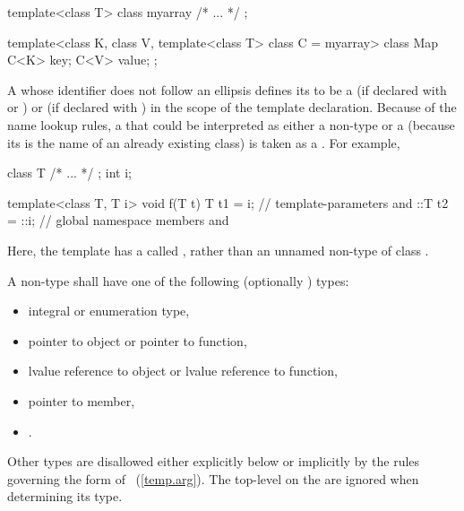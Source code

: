 \begin{codeblock}
template<class T> class myarray { /* ... */ };

template<class K, class V, template<class T> class C = myarray>
class Map {
  C<K> key;
  C<V> value;
};
\end{codeblock}
\exitnote

\pnum
A
whose identifier does not follow an ellipsis
defines its
to be a
(if declared with
or
)
or
(if declared with
)
in the scope of the template declaration.
\enternote
Because of the name lookup rules, a
that could be interpreted as either a non-type
or a
(because its
is the name of an already existing class) is taken as a
.
For example,

\begin{codeblock}
class T { /* ... */ };
int i;

template<class T, T i> void f(T t) {
  T t1 = i;         // template-parameters  and 
  ::T t2 = ::i;     // global namespace members  and 
}
\end{codeblock}

Here, the template
has a
called
,
rather than an unnamed non-type
of class
.
\exitnote

\pnum
A non-type
shall have one of the following (optionally
)
types:

\begin{itemize}
\item integral or enumeration type,

\item pointer to object or pointer to function,

\item lvalue reference to object or lvalue reference to function,

\item pointer to member,

\item {}.
\end{itemize}

\pnum
\enternote
Other types are disallowed either explicitly below or implicitly by
the rules governing the form of
~(\ref{temp.arg}).
\exitnote
The top-level
on the
are ignored when determining its type.

